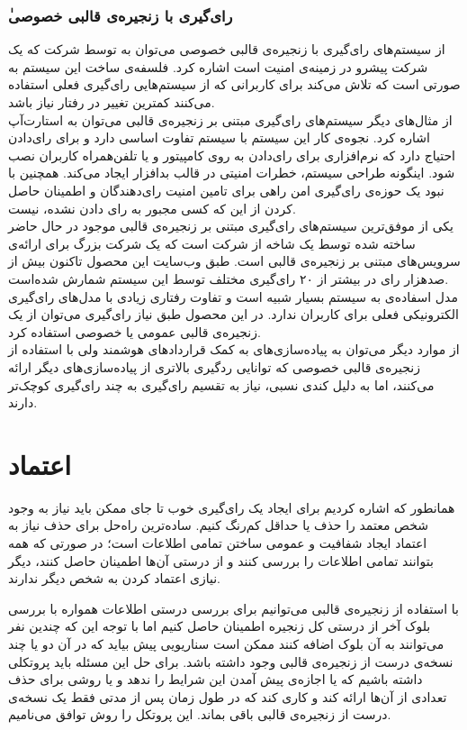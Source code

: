 \subsubsection{ٰرای‌گیری با زنجیره‌ی قالبی خصوصی}
از سیستم‌های رای‌گیری با زنجیره‌ی قالبی خصوصی می‌توان به 
\cite{votebook}
توسط شرکت 
که یک شرکت پیشرو در زمینه‌ی امنیت است اشاره کرد. فلسفه‌ی ساخت این سیستم به صورتی است که تلاش می‌کند برای کاربرانی که از سیستم‌هایی رای‌گیری فعلی استفاده می‌کنند کمترین تغییر در رفتار نیاز باشد. 
\\
از مثال‌های دیگر سیستم‌های رای‌گیری مبتنی بر زنجیره‌ی قالبی می‌توان به استارت‌آپ 
اشاره کرد. نجوه‌ی کار این سیستم با سیستم 
تفاوت اساسی دارد و برای رای‌دادن احتیاج دارد که نرم‌‌افزاری برای رای‌دادن به روی کامپیتور و یا تلفن‌همراه کاربران نصب شود. اینگونه طراحی سیستم،‌ خطرات امنیتی در قالب بدافزار ایجاد می‌کند. همچنین با نبود یک حوزه‌ی رای‌گیری امن راهی برای تامین امنیت رای‌دهندگان و اطمینان حاصل کردن از این که کسی مجبور به رای‌ دادن نشده، نیست.
\\
یکی از موفق‌ترین سیستم‌های رای‌گیری مبتنی بر زنجیره‌ی قالبی موجود در حال حاضر 
ساخته شده توسط یک شاخه از شرکت 
است که یک شرکت بزرگ برای ارائه‌ی سرویس‌های مبتنی بر زنجیره‌ی قالبی است. طبق وب‌سایت این محصول تاکنون بیش از صدهزار رای در بیشتر از ۲۰ رای‌گیری مختلف توسط این سیستم‌ شمارش شده‌است. 
\\
مدل اسفاده‌ی 
به سیستم‌ 
بسیار شبیه است و تفاوت رفتاری زیادی با مدل‌های رای‌گیری الکترونیکی فعلی برای کاربران ندارد. در این محصول طبق نیاز رای‌گیری می‌توان از یک زنجیره‌ی قالبی عمومی یا خصوصی استفاده کرد.
\\
از موارد دیگر می‌توان به پیاده‌سازی‌های به کمک قرارداد‌های هوشمند ولی با استفاده از زنجیره‌ی قالبی خصوصی 
\cite{privblock}
که توانایی ردگیری بالاتری از پیاده‌سازی‌های دیگر ارائه می‌کنند، اما به دلیل کندی نسبی، نیاز به تقسیم رای‌گیری به چند رای‌گیری کوچک‌تر دارند.


\section{اعتماد}
همانطور که اشاره کردیم برای ایجاد یک رای‌گیری خوب تا جای ممکن باید نیاز به وجود شخص معتمد را حذف یا حداقل کم‌رنگ کنیم. ساده‌ترین راه‌حل برای حذف نیاز به اعتماد ایجاد شفافیت و عمومی ساختن تمامی اطلاعات است؛ در صورتی که همه بتوانند تمامی اطلاعات را بررسی کنند و از درستی آن‌ها اطمینان حاصل کنند، دیگر نیازی اعتماد کردن به شخص دیگر ندارند. 
\par 
با استفاده از زنجیره‌ی قالبی می‌‌توانیم برای بررسی درستی اطلاعات همواره با بررسی بلوک آخر از درستی کل زنجیره اطمینان حاصل کنیم اما با توجه این که چندین نفر می‌توانند به آن بلوک اضافه کنند ممکن است سناریویی پیش بیاید که در آن دو یا چند نسخه‌ی درست از زنجیره‌ی قالبی وجود داشته باشد. برای حل این مسئله باید پروتکلی داشته باشیم که یا اجازه‌ی پیش آمدن این شرایط را ندهد و یا روشی برای حذف تعدادی از آن‌ها ارائه کند و کاری کند که در طول زمان پس از مدتی فقط یک نسخه‌ی درست از زنجیره‌ی قالبی باقی بماند. این پروتکل را روش توافق می‌نامیم.
